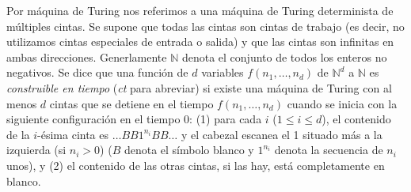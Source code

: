Por máquina de Turing nos referimos a una máquina de Turing determinista de múltiples cintas. Se supone que todas las cintas son cintas de trabajo (es decir, no utilizamos cintas especiales de entrada o salida) y que las cintas son infinitas en ambas direcciones. Generlamente $\mathbb{N}$ denota el conjunto de todos los enteros no negativos. Se dice que una función de $d$ variables $f(n_1, \dots, n_d)$ de $\mathbb{N}^d$ a $\mathbb{N}$ es \emph{construible en tiempo} (\emph{ct} para abreviar) si existe una máquina de Turing con al menos $d$ cintas que se detiene en el tiempo $f(n_1, \dots, n_d)$ cuando se inicia con la siguiente configuración en el tiempo 0: (1) para cada $i$ ($1 \leqslant i \leqslant d$), el contenido de la $i$-ésima cinta es $\dots BB1^{n_i}BB\dots$ y el cabezal escanea el 1 situado más a la izquierda (si $n_i > 0$) ($B$ denota el símbolo blanco y $1^{n_i}$ denota la secuencia de $n_i$ unos), y (2) el contenido de las otras cintas, si las hay, está completamente en blanco.\cite{kobayashi1985proving}\\

